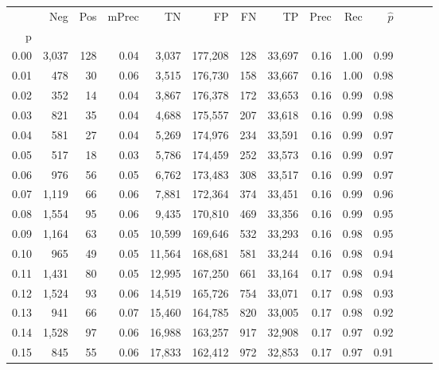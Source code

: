 \begin{tabular}{rrrrrrrrrrrrrr}
\toprule
{} &    Neg &  Pos & mPrec &       TN &       FP &      FN &      TP &  Prec &   Rec & $\hat{p}$ \\
p    &        &      &       &          &          &         &         &       &       &           \\
\midrule
0.00 &  3,037 &  128 &  0.04 &    3,037 &  177,208 &     128 &  33,697 &  0.16 &  1.00 &      0.99 \\
0.01 &    478 &   30 &  0.06 &    3,515 &  176,730 &     158 &  33,667 &  0.16 &  1.00 &      0.98 \\
0.02 &    352 &   14 &  0.04 &    3,867 &  176,378 &     172 &  33,653 &  0.16 &  0.99 &      0.98 \\
0.03 &    821 &   35 &  0.04 &    4,688 &  175,557 &     207 &  33,618 &  0.16 &  0.99 &      0.98 \\
0.04 &    581 &   27 &  0.04 &    5,269 &  174,976 &     234 &  33,591 &  0.16 &  0.99 &      0.97 \\
0.05 &    517 &   18 &  0.03 &    5,786 &  174,459 &     252 &  33,573 &  0.16 &  0.99 &      0.97 \\
0.06 &    976 &   56 &  0.05 &    6,762 &  173,483 &     308 &  33,517 &  0.16 &  0.99 &      0.97 \\
0.07 &  1,119 &   66 &  0.06 &    7,881 &  172,364 &     374 &  33,451 &  0.16 &  0.99 &      0.96 \\
0.08 &  1,554 &   95 &  0.06 &    9,435 &  170,810 &     469 &  33,356 &  0.16 &  0.99 &      0.95 \\
0.09 &  1,164 &   63 &  0.05 &   10,599 &  169,646 &     532 &  33,293 &  0.16 &  0.98 &      0.95 \\
0.10 &    965 &   49 &  0.05 &   11,564 &  168,681 &     581 &  33,244 &  0.16 &  0.98 &      0.94 \\
0.11 &  1,431 &   80 &  0.05 &   12,995 &  167,250 &     661 &  33,164 &  0.17 &  0.98 &      0.94 \\
0.12 &  1,524 &   93 &  0.06 &   14,519 &  165,726 &     754 &  33,071 &  0.17 &  0.98 &      0.93 \\
0.13 &    941 &   66 &  0.07 &   15,460 &  164,785 &     820 &  33,005 &  0.17 &  0.98 &      0.92 \\
0.14 &  1,528 &   97 &  0.06 &   16,988 &  163,257 &     917 &  32,908 &  0.17 &  0.97 &      0.92 \\
0.15 &    845 &   55 &  0.06 &   17,833 &  162,412 &     972 &  32,853 &  0.17 &  0.97 &      0.91 \\

\end{tabular}
